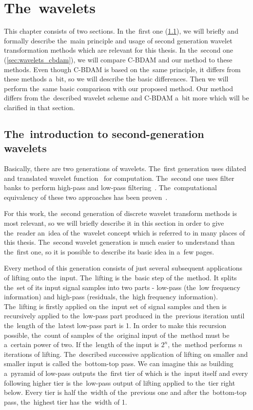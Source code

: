 \chapter{The~wavelets}\label{chap:wavelets_comp}

This chapter consists of two sections. In the~first one (\ref{sec:wavelets}), we will briefly and formally describe the~main principle and usage of second generation wavelet transformation methods which are relevant for this thesis. In the~second one (\ref{sec:wavelets_cbdam}), we will compare C-BDAM and our method to these methods. Even though C-BDAM is based on the~same principle, it differs from these methods a~bit, so we will describe the basic differences. Then we will perform the~same basic comparison with our proposed method. Our method differs from the~described wavelet scheme and C-BDAM a~bit more which will be clarified in that section.

\section{The~introduction to second-generation wavelets}\label{sec:wavelets}
Basically, there are two generations of wavelets. The~first generation uses dilated and translated wavelet function~\cite{waveletsTutorial} for computation. The~second one uses filter banks to perform high-pass and low-pass filtering~\cite{waveletsLifting}. The~computational equivalency of these two approaches has been proven~\cite{waveletsEquiv}.

For this work, the~second generation of discrete wavelet transform methods is most relevant, so we will briefly describe it in this section in order to give the~reader an~idea of the~wavelet concept which is referred to in many places of this thesis. The~second wavelet generation is much easier to understand than the~first one, so it is possible to describe its basic idea in a~few pages.

Every method of this generation consists of just several subsequent applications of lifting onto the~input. The~lifting is the~basic step of the~method. It splits the~set of its input signal samples into two parts - low-pass (the~low frequency information) and high-pass (residuals, the~high frequency information). The~lifting is firstly applied on the~input set of signal samples and then is recursively applied to the~low-pass part produced in the~previous iteration until the~length of the~latest low-pass part is 1. In order to make this recursion possible, the~count of samples of the~original input of the~method must be a~certain power of two. If the~length of the input is $2^n$, the~method performs $n$ iterations of lifting. The~described successive application of lifting on smaller and smaller input is called the~bottom-top pass. We can imagine this as building a~pyramid of low-pass outputs the~first tier of which is the~input itself and every following higher tier is the~low-pass output of lifting applied to the~tier right below. Every tier is half the~width of the~previous one and after the~bottom-top pass, the~highest tier has the~width of 1.

